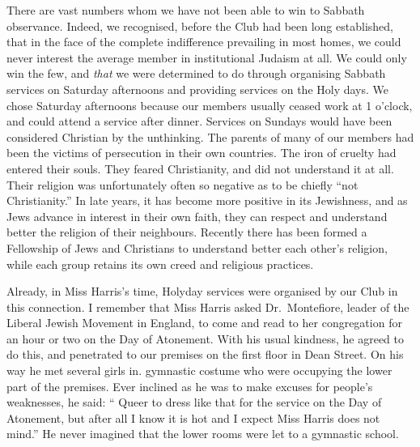 There are vast numbers whom we have not been able
to win to Sabbath observance. Indeed, we recognised,
before the Club had been long established, that in the
face of the complete indifference prevailing in most
homes, we could never interest the average member in
institutional Judaism at all. We could only win the few,
and \textsl{that} we were determined to do through organising
Sabbath services on Saturday afternoons and providing
services on the Holy days. We chose Saturday afternoons
because our members usually ceased work at
1 o'clock, and could attend a service after dinner. Services
on Sundays would have been considered
Christian by the unthinking. The parents of many of our
members had been the victims of persecution in their own
countries. The iron of cruelty had entered their souls.
They feared Christianity, and did not understand it at all.
Their religion was unfortunately often so negative as to
be chiefly “not Christianity.” In late years, it has become
more positive in its Jewishness, and as Jews advance
in interest in their own faith, they can respect and understand
better the religion of their neighbours. Recently
there has been formed a Fellowship of Jews and
Christians to understand better each other’s religion, while
each group retains its own creed and religious practices.

Already, in Miss Harris’s time, Holyday services were
organised by our Club in this connection. I remember
that Miss Harris asked Dr.\ Montefiore, leader of the
Liberal Jewish Movement in England, to come and read
to her congregation for an hour or two on the Day of
Atonement. With his usual kindness, he agreed to do this,
and penetrated to our premises on the first floor in Dean
Street. On his way he met several girls in. gymnastic
costume who were occupying the lower part of the
premises. Ever inclined as he was to make excuses for
people’s weaknesses, he said: “ Queer to dress like that
for the service on the Day of Atonement, but after all I
know it is hot and I expect Miss Harris does not mind.”
He never imagined that the lower rooms were let to a
gymnastic school.


